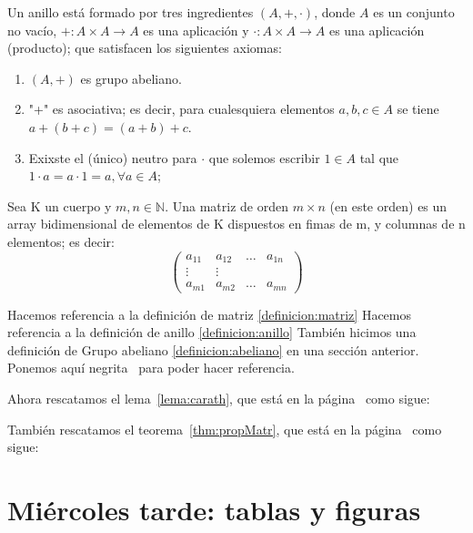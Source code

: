 \begin{definicion}[Anillo] \label{definicion:anillo}
	Un anillo está formado por tres ingredientes $(A,+,\cdot)$, donde $A$ es un conjunto no vacío, $+ : A\times A \rightarrow A$ es una aplicación y $\cdot: A\times A \rightarrow A$ es una aplicación (producto); que satisfacen los siguientes axiomas:
	\begin{enumerate}
		\item  $(A,+)$ es grupo abeliano.
		\item "+" es asociativa; es decir, para cualesquiera elementos $ a,b,c\in A$ se tiene $a+(b+c)=(a+b)+c$.
		\item Exixste el (único) neutro para $\cdot$ que solemos escribir $1\in A$ tal que $1\cdot a=a\cdot 1=a, \forall a\in A$;
	\end{enumerate}
\end{definicion}

\begin{definicion}[Matriz] \label{definicion:matriz}
	Sea K un cuerpo y $m, n\in \mathbb{N}$. Una matriz de orden $m\times n$ (en este orden) es un array bidimensional de elementos de K dispuestos en fimas de m, y columnas de n elementos; es decir:
	\[
	\begin{pmatrix}
		a_{11}&a_{12}& \dots & a_{1n}\\
		\vdots &\vdots \\
		a_{m1}&a_{m2}& \dots & a_{mn}
	\end{pmatrix}
	\]
\end{definicion}

Hacemos referencia a la definición de matriz \ref{definicion:matriz}
Hacemos referencia a la definición de anillo \ref{definicion:anillo}
También hicimos una definición de Grupo abeliano \ref{definicion:abeliano} en una sección anterior.
Ponemos aquí negrita~ para poder hacer referencia.

Ahora rescatamos el lema~\ref{lema:carath}, que está en la página~\pageref{lema:carath} como sigue:
\carath*

También rescatamos el teorema~\ref{thm:propMatr}, que está en la página~\pageref{thm:propMatr} como sigue:
\propMatr*

\section[Tablas y figuras]{Miércoles tarde: tablas y figuras}

